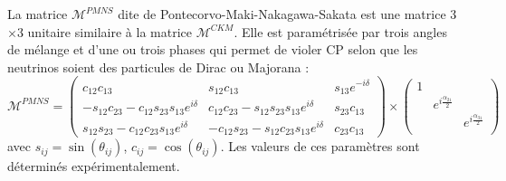 La matrice $\mathcal{M}^{PMNS}$ dite de Pontecorvo-Maki-Nakagawa-Sakata est une matrice \num{3}$\times$\num{3} unitaire similaire à la matrice $\mathcal{M}^{CKM}$. Elle est paramétrisée par trois angles de mélange et d'une ou trois phases qui permet de violer CP selon que les neutrinos soient des particules de Dirac ou Majorana :
\begin{equation}
\mathcal{M}^{PMNS}= 
\begin{pmatrix} 
c_{12}c_{13} & s_{12}c_{13} & s_{13}e^{-i\delta} \\
-s_{12}c_{23}-c_{12}s_{23}s_{13}e^{i\delta} & c_{12}c_{23}-s_{12}s_{23}s_{13}e^{i\delta} & s_{23}c_{13} \\
s_{12}s_{23}-c_{12}c_{23}s_{13}e^{i\delta} & -c_{12}s_{23}-s_{12}c_{23}s_{13}e^{i\delta} & c_{23}c_{13}
\end{pmatrix}\times \begin{pmatrix}
    1 \\
    & e^{i\frac{\alpha_{21}}{2}} \\
    & & e^{i\frac{\alpha_{31}}{2}} \\
\end{pmatrix}
\end{equation}
avec $s_{ij}=\sin(\theta_{ij})$, $c_{ij}=\cos(\theta_{ij})$.
Les valeurs de ces paramètres sont déterminés expérimentalement.
